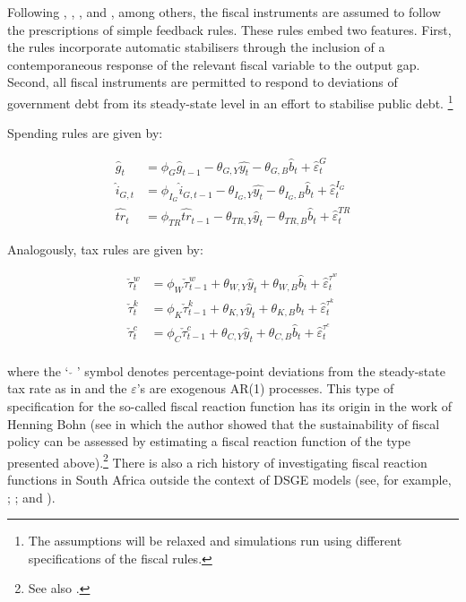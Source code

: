 \documentclass[a4paper,11pt]{article}
\numberwithin{equation}{section}
\begin{document}
	
	Following \cite{leeper2010}, \cite{coenen2012}, \cite{born2013}, and \cite{leeper2017}, among others, the fiscal instruments are assumed to follow the prescriptions of simple feedback rules. These rules embed two features. First, the rules incorporate automatic stabilisers through the inclusion of a contemporaneous response of the relevant fiscal variable to the output gap. Second, all fiscal instruments are permitted to respond to deviations of government debt from its steady-state level in an effort to stabilise public debt. \footnote{The assumptions will be relaxed and simulations run using different specifications of the fiscal rules.} 
	
	Spending rules are given by:	
	
	\begin{align}
	\hat{g}_t&=\phi_G\hat{g}_{t-1}-\theta_{G,Y}\hat{y_t} -\theta_{G,B}\hat{b}_t+\hat{\varepsilon}_t^G\\\label{g_rule}
	\hat{i}_{G,t}&=\phi_{I_G}\hat{i}_{G,t-1}-\theta_{I_G,Y}\hat{y_t}-\theta_{I_G,B}\hat{b}_t+\hat{\varepsilon}_t^{I_G}\\
	\hat{tr}_t&=\phi_{TR}\hat{tr}_{t-1}-\theta_{TR,Y}\hat{y}_t-\theta_{TR,B}\hat{b}_t+\hat{\varepsilon}_t^{TR} \label{eq_tr}
	\end{align} 
	
	Analogously, tax rules are given by:
	
	\begin{align}
	\check{\tau}_t^w&=\phi_W\check{\tau}_{t-1}^w+\theta_{W,Y}\hat{y}_t+\theta_{W,B}\hat{b}_t+\hat{\varepsilon}_t^{\tau^w}\\\label{eq_tauw}
	\check{\tau}_t^k&=\phi_K\check{\tau}_{t-1}^k+\theta_{K,Y}\hat{y}_t+\theta_{K,B}\hat{b}_t+\hat{\varepsilon}_t^{\tau^k}\\
	\check{\tau}_t^c&=\phi_C\check{\tau}_{t-1}^c+\theta_{C,Y}\hat{y}_t+\theta_{C,B}\hat{b}_t+\hat{\varepsilon}_t^{\tau^c}\\\label{tc_rule}
	\end{align}
	
	where the ` $\check{}$ ' symbol denotes percentage-point deviations from the steady-state tax rate as in \cite{coenen2013} and the $\varepsilon$'s are exogenous AR(1) processes. This type of specification for the so-called fiscal reaction function has its origin in the work of Henning Bohn (see \citealp{bohn1998} in which the author showed that the sustainability of fiscal policy can be assessed by estimating a fiscal reaction function of the type presented above).\footnote{See also \cite{bohn1995,bohn2007,bohn2011}.} There is also a rich history of investigating fiscal reaction functions in South Africa outside the context of DSGE models (see, for example, \citealp{burger2012a}; \citealp{burger2012b}; and \citealp{burger2015}).  
	
\end{document}
